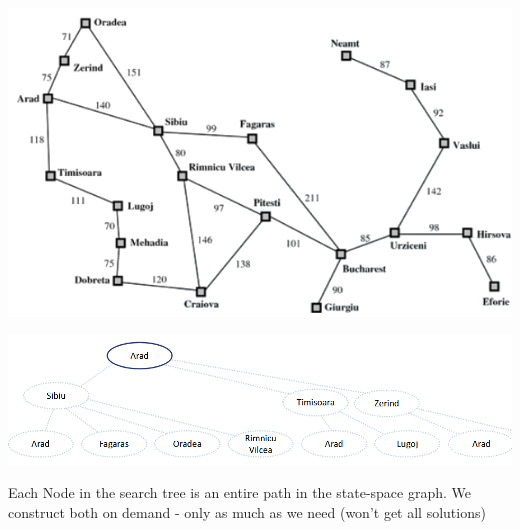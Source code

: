 \documentclass[
../../EiKI_Summary.tex,
]
{subfiles}
\begin{document}
\begin{codebox}
    \begin{algorithm}[H]
    \end{algorithm}
\end{codebox}
\begin{minipage}
    [t]{0.45\textwidth}
    \centering
    \includegraphics[width=\textwidth]{Pics/3/ExampleTreeSearchGraph.png}
\end{minipage}
\hfill
\begin{minipage}
    [t]{0.55\textwidth}
    \centering
    \includegraphics[width=\textwidth]{Pics/3/ExampleTreeSearchTree.png}
\end{minipage}

Each Node in the search tree is an entire path in the state-space graph. We construct both on demand - only as much as we need (won't get all solutions)
\end{document}
